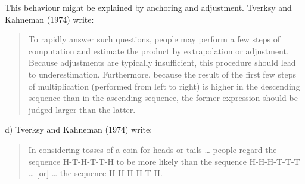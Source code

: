 \documentclass[
  letterpaper,
  DIV=11,
  numbers=noendperiod]{scrreprt}
\begin{document}
\begin{tcolorbox}[enhanced jigsaw, title=\textcolor{quarto-callout-tip-color}{\faLightbulb}\hspace{0.5em}{Answer}, toprule=.15mm, colback=white, breakable, titlerule=0mm, colframe=quarto-callout-tip-color-frame, coltitle=black, opacityback=0, rightrule=.15mm, colbacktitle=quarto-callout-tip-color!10!white, bottomtitle=1mm, opacitybacktitle=0.6, arc=.35mm, bottomrule=.15mm, toptitle=1mm, leftrule=.75mm, left=2mm]

This behaviour might be explained by anchoring and adjustment. Tverksy
and Kahneman (1974) write:

\begin{quote}
To rapidly answer such questions, people may perform a few steps of
computation and estimate the product by extrapolation or adjustment.
Because adjustments are typically insufficient, this procedure should
lead to underestimation. Furthermore, because the result of the first
few steps of multiplication (performed from left to right) is higher in
the descending sequence than in the ascending sequence, the former
expression should be judged larger than the latter.
\end{quote}

\end{tcolorbox}

d) Tverksy and Kahneman (1974) write:

\begin{quote}
In considering tosses of a coin for heads or tails \ldots{} people
regard the sequence H-T-H-T-T-H to be more likely than the sequence
H-H-H-T-T-T \ldots{} {[}or{]} \ldots{} the sequence H-H-H-H-T-H.
\end{quote}
\end{document}
